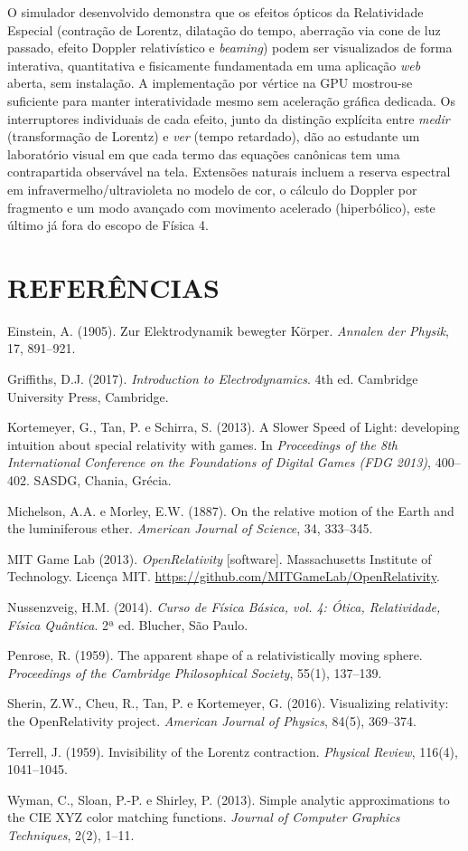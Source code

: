 \documentclass[10pt,a4paper,twocolumn]{article}
\newenvironment{referencias}
  {\section*{REFERÊNCIAS}\small
   \begin{list}{}{\setlength{\leftmargin}{1.4em}\setlength{\itemindent}{-1.4em}%
                  \setlength{\itemsep}{2pt}\setlength{\parsep}{0pt}}}
  {\end{list}}
\begin{document}
O simulador desenvolvido demonstra que os efeitos ópticos da Relatividade Especial
(contração de Lorentz, dilatação do tempo, aberração via cone de luz passado, efeito
Doppler relativístico e \emph{beaming}) podem ser visualizados de forma interativa,
quantitativa e fisicamente fundamentada em uma aplicação \emph{web} aberta, sem
instalação. A implementação por vértice na GPU mostrou-se suficiente para manter
interatividade mesmo sem aceleração gráfica dedicada. Os interruptores individuais de
cada efeito, junto da distinção explícita entre \emph{medir} (transformação de Lorentz) e
\emph{ver} (tempo retardado), dão ao estudante um laboratório visual em que cada termo das
equações canônicas tem uma contrapartida observável na tela. Extensões naturais incluem a reserva espectral em
infravermelho/ultravioleta no modelo de cor, o cálculo do Doppler por fragmento e um modo
avançado com movimento acelerado (hiperbólico), este último já fora do escopo de Física 4.

\begin{referencias}
  \item Einstein, A. (1905). Zur Elektrodynamik bewegter Körper. \emph{Annalen der
        Physik}, 17, 891--921.
  \item Griffiths, D.J. (2017). \emph{Introduction to Electrodynamics}. 4th ed.
        Cambridge University Press, Cambridge.
  \item Kortemeyer, G., Tan, P. e Schirra, S. (2013). A Slower Speed of Light: developing
        intuition about special relativity with games. In \emph{Proceedings of the 8th
        International Conference on the Foundations of Digital Games (FDG 2013)},
        400--402. SASDG, Chania, Grécia.
  \item Michelson, A.A. e Morley, E.W. (1887). On the relative motion of the Earth and
        the luminiferous ether. \emph{American Journal of Science}, 34, 333--345.
  \item MIT Game Lab (2013). \emph{OpenRelativity} [software]. Massachusetts Institute of
        Technology. Licença MIT. \url{https://github.com/MITGameLab/OpenRelativity}.
  \item Nussenzveig, H.M. (2014). \emph{Curso de Física Básica, vol. 4: Ótica,
        Relatividade, Física Quântica}. 2ª ed. Blucher, São Paulo.
  \item Penrose, R. (1959). The apparent shape of a relativistically moving sphere.
        \emph{Proceedings of the Cambridge Philosophical Society}, 55(1), 137--139.
  \item Sherin, Z.W., Cheu, R., Tan, P. e Kortemeyer, G. (2016). Visualizing relativity:
        the OpenRelativity project. \emph{American Journal of Physics}, 84(5), 369--374.
  \item Terrell, J. (1959). Invisibility of the Lorentz contraction. \emph{Physical
        Review}, 116(4), 1041--1045.
  \item Wyman, C., Sloan, P.-P. e Shirley, P. (2013). Simple analytic approximations to
        the CIE XYZ color matching functions. \emph{Journal of Computer Graphics
        Techniques}, 2(2), 1--11.
\end{referencias}
\end{document}
